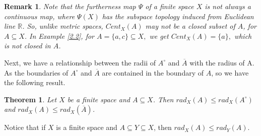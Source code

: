 \documentclass[12pt]{amsart}
\newtheorem{theorem}[definition]{Theorem}
\newtheorem{remark}[definition]{Remark}
\begin{document}
\begin{remark}
	{\normalfont
		Note that the furtherness map $\Psi$ of a finite space $X$ is not always a continuous map, where $\Psi(X)$ has the subspace topology induced from Euclidean line $\mathbb{R}$. So, unlike metric spaces, $Cent_{X}(A)$ may not be a closed subset of $A$, for $A\subseteq X$. In Example \ref{2.2}, for $A=\{a,c\}\subseteq X,$ we get $Cent_{X}(A)=\{a\},$ which is not closed in $A$.}
\end{remark}

Next, we have a relationship between
the radii of $A^\circ$ and $\overline{A}$ with the radius of A. As the  boundaries of $A^\circ$ and $\overline{A}$ are contained in the boundary of $A$, so %
we have the following result.

\begin{theorem}
	Let $X$ be a finite  space and $A \subseteq X$.
	Then $rad_X(A) \leq rad_X(A^\circ)$ and $rad_X(A) \leq  rad_X(\overline{A})$.
\end{theorem}



Notice that if $X$ is a finite space and $A \subseteq Y \subseteq X$, then $rad_X(A) \leq  rad_Y (A).$\\

\end{document}
